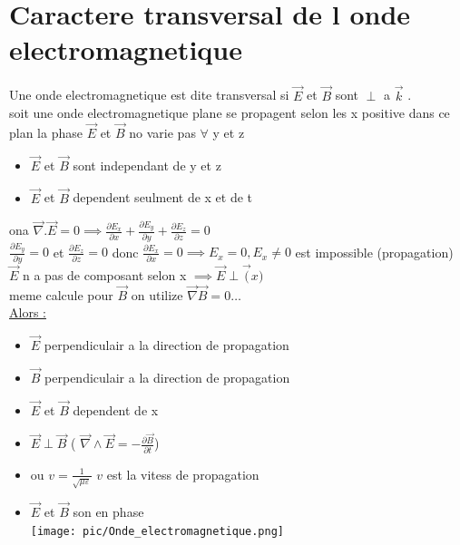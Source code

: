 \documentclass[12pt]{book}
\begin{document}
        \section{Caractere transversal de l onde electromagnetique}
            Une onde electromagnetique est dite transversal si $\vec{E}$ et $\vec{B}$ sont $\perp $ a $\vec{k}$ .
            \\ soit une onde electromagnetique plane se propagent selon les x positive dans ce plan la phase $\vec{E}$ et $\vec{B}$ no varie pas $\forall$ y et z 
            \begin{itemize}
                \item $\vec{E}$ et $\vec{B}$ sont independant de y et z
                \item $\vec{E}$ et $\vec{B}$ dependent seulment de x et de t
            \end{itemize}
            ona $ \vec{\nabla}.\vec{E} =0 \implies \frac{\partial E_x}{\partial x} + \frac{\partial E_y}{\partial y} + \frac{\partial E_z}{\partial z} =0 $ \\
            $ \frac{\partial E_y}{\partial y} =0 $ et $  \frac{\partial E_z}{\partial z} =0 $ donc $ \frac{\partial E_x}{\partial x} =0 \implies E_x =0  , E_x \not = 0$ est impossible (propagation) \\
            $\vec{E} $ n a pas de composant selon x $ \implies \vec{E} \perp \vec(x)$ \\
            meme calcule pour $\vec{B} $ on utilize $\vec{\nabla}\vec{B}=0 \ldots $ \\
            \underline{Alors :}
                \begin{itemize}
                    \item $\vec{E}$ perpendiculair a la direction de propagation
                    \item $\vec{B}$ perpendiculair a la direction de propagation
                    \item $\vec{E}$ et $\vec{B}$ dependent de x
                    \item $\vec{E} \perp \vec{B}$ ( $\vec{\nabla}\wedge\vec{E} = -\frac{\partial \vec{B}}{\partial t}$) 
                    \item {} ou $v = \frac{1}{\sqrt{\mu\varepsilon}}$ $v$ est la vitess de propagation
                    \item $\vec{E}$ et $\vec{B}$ son en phase \\ \texttt{[image: pic/Onde\_electromagnetique.png]}
                \end{itemize}
\end{document}
